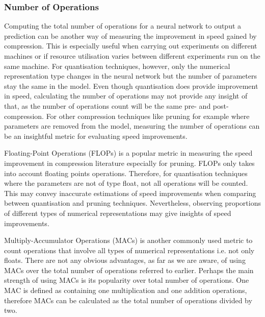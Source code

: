 \subsubsection{Number of Operations}
Computing the total number of operations for a neural network to output a prediction can be another way of measuring the improvement in speed gained by compression. 
%
This is especially useful when carrying out experiments on different machines or if resource utilisation varies between different experiments run on the same machine. 
%
For quantisation techniques, however, only the numerical representation type changes in the neural network but the number of parameters stay the same in the model. 
%
Even though quantisation does provide improvement in speed, calculating the number of operations may not provide any insight of that, as the number of operations count will be the same pre- and post-compression. 
%
For other compression techniques like pruning for example where parameters are removed from the model, measuring the number of operations can be an insightful metric for evaluating speed improvements.

Floating-Point Operations (FLOPs) is a popular metric in measuring the speed improvement in compression literature especially for pruning. FLOPs only takes into account floating points operations. 
%
Therefore, for quantisation techniques where the parameters are not of type float, not all operations will be counted. This may convey inaccurate estimations of speed improvements when comparing between quantisation and pruning techniques. Nevertheless, observing proportions of different types of numerical representations may give insights of speed improvements.  
%
%


Multiply-Accumulator Operations (MACs) is another commonly used metric to count operations that involve all types of numerical representations i.e. not only floats. There are not any obvious advantages, as far as we are aware, of using MACs over the total number of operations referred to earlier. Perhaps the main strength of using MACs is its popularity over total number of operations. One MAC is defined as containing one multiplication and one addition operations, therefore MACs can be calculated as the total number of operations divided by two. 

